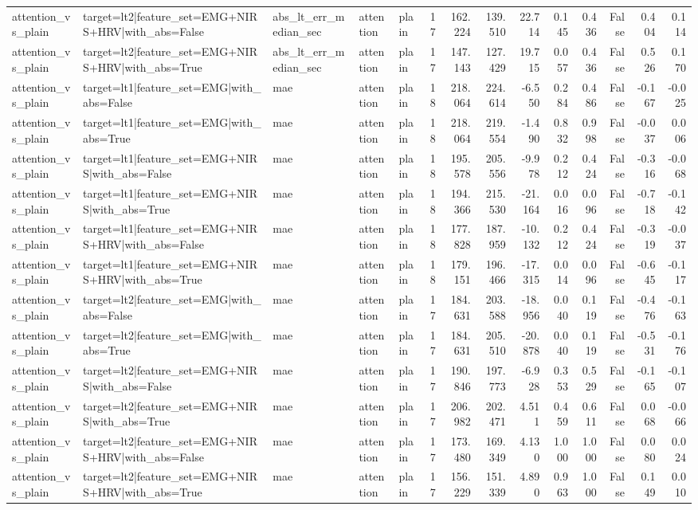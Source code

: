 \begin{table}
\begin{tabular}{lllllrrrrrrrrr}
attention_vs_plain & target=lt2|feature_set=EMG+NIRS+HRV|with_abs=False & abs_lt_err_median_sec & attention & plain & 17 & 162.224 & 139.510 & 22.714 & 0.145 & 0.436 & False & 0.404 & 0.114 \\
attention_vs_plain & target=lt2|feature_set=EMG+NIRS+HRV|with_abs=True & abs_lt_err_median_sec & attention & plain & 17 & 147.143 & 127.429 & 19.715 & 0.057 & 0.436 & False & 0.526 & 0.170 \\
attention_vs_plain & target=lt1|feature_set=EMG|with_abs=False & mae & attention & plain & 18 & 218.064 & 224.614 & -6.550 & 0.284 & 0.486 & False & -0.167 & -0.025 \\
attention_vs_plain & target=lt1|feature_set=EMG|with_abs=True & mae & attention & plain & 18 & 218.064 & 219.554 & -1.490 & 0.832 & 0.998 & False & -0.037 & 0.006 \\
attention_vs_plain & target=lt1|feature_set=EMG+NIRS|with_abs=False & mae & attention & plain & 18 & 195.578 & 205.556 & -9.978 & 0.212 & 0.424 & False & -0.316 & -0.068 \\
attention_vs_plain & target=lt1|feature_set=EMG+NIRS|with_abs=True & mae & attention & plain & 18 & 194.366 & 215.530 & -21.164 & 0.016 & 0.096 & False & -0.718 & -0.142 \\
attention_vs_plain & target=lt1|feature_set=EMG+NIRS+HRV|with_abs=False & mae & attention & plain & 18 & 177.828 & 187.959 & -10.132 & 0.212 & 0.424 & False & -0.319 & -0.037 \\
attention_vs_plain & target=lt1|feature_set=EMG+NIRS+HRV|with_abs=True & mae & attention & plain & 18 & 179.151 & 196.466 & -17.315 & 0.014 & 0.096 & False & -0.645 & -0.117 \\
attention_vs_plain & target=lt2|feature_set=EMG|with_abs=False & mae & attention & plain & 17 & 184.631 & 203.588 & -18.956 & 0.040 & 0.119 & False & -0.476 & -0.163 \\
attention_vs_plain & target=lt2|feature_set=EMG|with_abs=True & mae & attention & plain & 17 & 184.631 & 205.510 & -20.878 & 0.040 & 0.119 & False & -0.531 & -0.176 \\
attention_vs_plain & target=lt2|feature_set=EMG+NIRS|with_abs=False & mae & attention & plain & 17 & 190.846 & 197.773 & -6.928 & 0.353 & 0.529 & False & -0.165 & -0.107 \\
attention_vs_plain & target=lt2|feature_set=EMG+NIRS|with_abs=True & mae & attention & plain & 17 & 206.982 & 202.471 & 4.511 & 0.459 & 0.611 & False & 0.068 & -0.066 \\
attention_vs_plain & target=lt2|feature_set=EMG+NIRS+HRV|with_abs=False & mae & attention & plain & 17 & 173.480 & 169.349 & 4.130 & 1.000 & 1.000 & False & 0.080 & 0.024 \\
attention_vs_plain & target=lt2|feature_set=EMG+NIRS+HRV|with_abs=True & mae & attention & plain & 17 & 156.229 & 151.339 & 4.890 & 0.963 & 1.000 & False & 0.149 & 0.010 \\
\bottomrule
\end{tabular}
\end{table}
